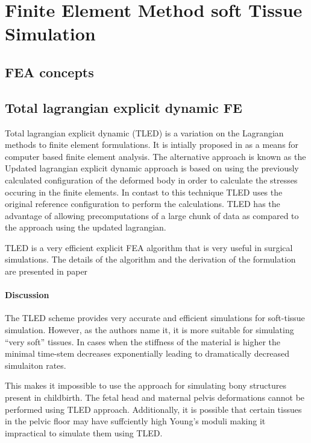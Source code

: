 \section{Finite Element Method soft Tissue Simulation}\label{methodology-fea}

\subsection{FEA concepts}

\subsection{Total lagrangian explicit dynamic FE}

  Total lagrangian explicit dynamic (TLED) is a variation on the Lagrangian methods to finite element formulations. It is intially proposed in \cite{Miller2007} as a means for computer based finite element analysis. The alternative approach is known as the Updated lagrangian explicit dynamic approach is based on using the previously calculated configuration of the deformed body in order to calculate the stresses occuring in the finite elements. In contast to this technique TLED uses the original reference configuration to perform the calculations. TLED has the advantage of allowing precomputations of a large chunk of data as compared to the approach using the updated lagrangian.

  TLED is a very efficient explicit FEA algorithm that is very useful in surgical simulations. The details of the algorithm and the derivation of the formulation are presented in paper \cite{Miller2007}

\paragraph{Discussion} The TLED scheme provides very accurate and efficient simulations for soft-tissue simulation. However, as the authors name it, it is more suitable for simulating ``very soft'' tissues. In cases when the stiffness of the material is higher the minimal time-stem decreases exponentially leading to dramatically decreased simulaiton rates.

This makes it impossible to use the approach for simulating bony structures present in childbirth. The fetal head and maternal pelvis deformations cannot be performed using TLED approach. Additionally, it is possible that certain tissues in the pelvic floor may have suffciently high Young's moduli making it impractical to simulate them using TLED.


